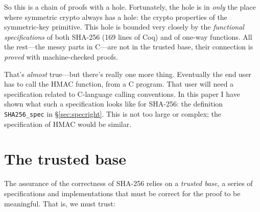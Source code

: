 \documentclass[prodmode,acmtoplas]{acmsmall}
\begin{document}
So this is a chain of proofs with a hole.  Fortunately,
the hole is in \emph{only} the place where symmetric crypto
always has a hole:  the crypto properties of the
symmetric-key primitive.  This hole is bounded very closely
by the \emph{functional specifications} of both
SHA-256 (169 lines of Coq) and of one-way functions.
All the rest---the messy parts in C---are not in the trusted
base, their connection is \emph{proved} with machine-checked proofs.

That's \emph{almost} true---but there's really one more thing.
Eventually the end user has to call
the HMAC function, from a C program.  That user will need a specification
related to C-language calling conventions.  In this paper I
have shown what such a specification looks like for SHA-256:
the definition \lstinline{SHA256_spec}
in \S\ref{sec:specright}.  This is not too large or complex;
the specification of HMAC would be similar.

\section{The trusted base}
The assurance of the correctness of SHA-256 relies on a \emph{trusted base,}
a series of specifications and implementations that must be correct
for the proof to be meaningful.
That is, we must trust:
\end{document}

